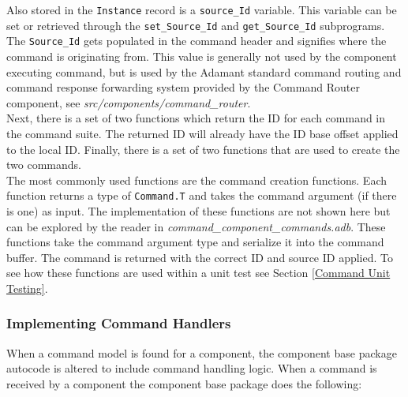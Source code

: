 Also stored in the \texttt{Instance} record is a \texttt{source\_Id} variable. This variable can be set or retrieved through the \texttt{set\_Source\_Id} and \texttt{get\_Source\_Id} subprograms. The \texttt{Source\_Id} gets populated in the command header and signifies where the command is originating from. This value is generally not used by the component executing command, but is used by the Adamant standard command routing and command response forwarding system provided by the Command Router component, see \textit{src/components/command\_router}. \\

Next, there is a set of two functions which return the ID for each command in the command suite. The returned ID will already have the ID base offset applied to the local ID. Finally, there is a set of two functions that are used to create the two commands. \\

The most commonly used functions are the command creation functions. Each function returns a type of \texttt{Command.T} and takes the command argument (if there is one) as input. The implementation of these functions are not shown here but can be explored by the reader in \textit{command\_component\_commands.adb}. These functions take the command argument type and serialize it into the command buffer. The command is returned with the correct ID and source ID applied. To see how these functions are used within a unit test see Section \ref{Command Unit Testing}.

\subsubsection{Implementing Command Handlers}

When a command model is found for a component, the component base package autocode is altered to include command handling logic. When a command is received by a component the component base package does the following:

